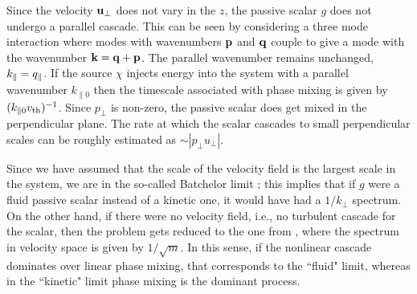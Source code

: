     Since the velocity $\mathbf{u}_\perp$ does not vary in the $z$, the passive scalar $g$ does not undergo a
    parallel cascade. This can be seen by considering a three mode interaction where modes with
    wavenumbers $\mathbf{p}$ and $\mathbf{q}$ couple to give a mode with the wavenumber $\mathbf{k} =
    \mathbf{q} + \mathbf{p}$. The parallel wavenumber remains unchanged, $k_\parallel = q_\parallel$. If the
    source $\chi$ injects energy into the system with a parallel wavenumber
    $k_{\parallel0}$ then the timescale
    associated with phase mixing is given by $(k_{\parallel0}v_{\rm th})^{-1}$.
    Since $p_\perp$ is non-zero, the passive scalar does get mixed in the
    perpendicular plane. The rate at which the scalar cascades to small perpendicular
    scales can be roughly estimated as $\sim |p_\perp u_\perp|$. 

    Since we have assumed that the scale of the velocity field is the largest scale in the
    system, we are in the so-called Batchelor limit \cite{batchelor59}; this implies that
    if $g$ were a fluid passive scalar
    instead of a kinetic one, it would have had a $1/k_\perp$ spectrum. On the other hand,
    if there were no velocity field, i.e., no turbulent cascade for the scalar, then the
    problem gets reduced to the one from
    , where the spectrum in velocity space is given by
    $1/\sqrt{m}$. In this sense, if the nonlinear cascade dominates over linear phase
    mixing, that corresponds to the ``fluid" limit, whereas in the ``kinetic" limit phase
    mixing is the dominant process.


